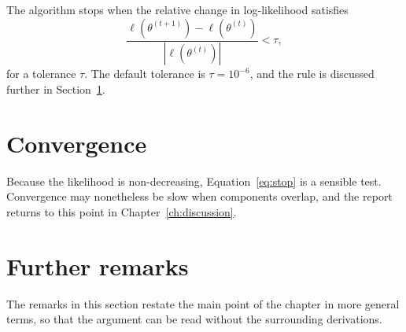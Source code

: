 The algorithm stops when the relative change in log-likelihood satisfies
\begin{equation}\label{eq:stop}
  \frac{\ell(\theta^{(t+1)})-\ell(\theta^{(t)})}{|\ell(\theta^{(t)})|} < \tau,
\end{equation}
for a tolerance $\tau$. The default tolerance is $\tau = 10^{-6}$, and the rule
is discussed further in Section~\ref{sec:convergence}.

\lipsum[31-32]

\section{Convergence}\label{sec:convergence}

Because the likelihood is non-decreasing, Equation~\eqref{eq:stop} is a
sensible test. Convergence may nonetheless be slow when components overlap,
and the report returns to this point in Chapter~\ref{ch:discussion}.

\lipsum[33-34]

\section{Further remarks}\label{sec:further-algorithms}

The remarks in this section restate the main point of the chapter in more
general terms, so that the argument can be read without the surrounding
derivations.

\lipsum[99-110]
